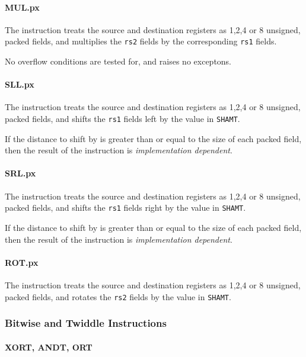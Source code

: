 \paragraph{MUL.px}

The instruction  treats the source and destination registers as
1,2,4 or 8 unsigned, packed fields, and multiplies the {\tt rs2} fields by
the corresponding {\tt rs1} fields.

No overflow conditions are tested for, and  raises no exceptons.

\paragraph{SLL.px}

The instruction  treats the source and destination registers as
1,2,4 or 8 unsigned, packed fields, and shifts the {\tt rs1} fields left
by the value in {\tt SHAMT}.

If the distance to shift by is greater than or equal to the size of each
packed field, then the result of the  instruction is
{\em implementation dependent}.

\paragraph{SRL.px}

The instruction  treats the source and destination registers as
1,2,4 or 8 unsigned, packed fields, and shifts the {\tt rs1} fields right
by the value in {\tt SHAMT}.

If the distance to shift by is greater than or equal to the size of each
packed field, then the result of the  instruction is
{\em implementation dependent}.

\paragraph{ROT.px}

The instruction  treats the source and destination registers as
1,2,4 or 8 unsigned, packed fields, and rotates the {\tt rs2} fields by
the value in {\tt SHAMT}.

\subsubsection{Bitwise and Twiddle Instructions}

\paragraph{XORT, ANDT, ORT}

